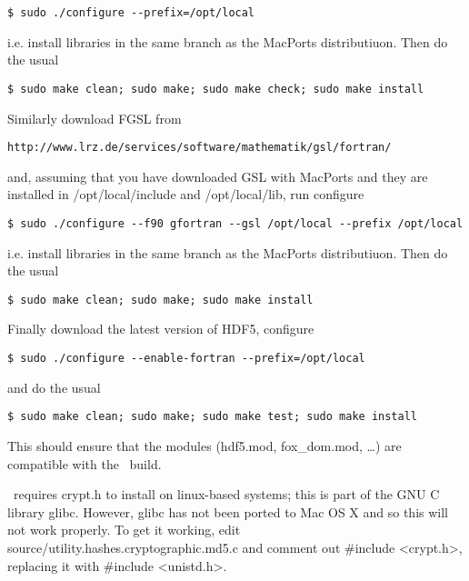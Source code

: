 \begin{verbatim}
$ sudo ./configure --prefix=/opt/local
\end{verbatim}

i.e. install libraries in the same branch as the MacPorts distributiuon. Then do the usual

\begin{verbatim}
$ sudo make clean; sudo make; sudo make check; sudo make install
\end{verbatim}

Similarly download FGSL from

\begin{verbatim}
http://www.lrz.de/services/software/mathematik/gsl/fortran/
\end{verbatim}

and, assuming that you have downloaded GSL with MacPorts and they are installed in {\normalfont \ttfamily /opt/local/include} and {\normalfont \ttfamily /opt/local/lib}, run {\normalfont \ttfamily configure}

\begin{verbatim}
$ sudo ./configure --f90 gfortran --gsl /opt/local --prefix /opt/local
\end{verbatim}

i.e. install libraries in the same branch as the MacPorts distributiuon. Then do the usual

\begin{verbatim}
$ sudo make clean; sudo make; sudo make install
\end{verbatim}

Finally download the latest version of HDF5, configure

\begin{verbatim}
$ sudo ./configure --enable-fortran --prefix=/opt/local
\end{verbatim}

and do the usual

\begin{verbatim}
$ sudo make clean; sudo make; sudo make test; sudo make install
\end{verbatim}

This should ensure that the modules ({\normalfont \ttfamily hdf5.mod}, {\normalfont \ttfamily fox\_dom.mod}, \ldots) are compatible with the \glc\ build.

\glc\ requires {\normalfont \ttfamily crypt.h} to install on linux-based systems; this is part of the GNU C library {\normalfont \ttfamily glibc}. However, {\normalfont \ttfamily glibc} has not been ported to Mac OS X and so this will not work properly. To get it working, edit {\normalfont \ttfamily source/utility.hashes.cryptographic.md5.c} and comment out {\normalfont \ttfamily \#include \textless crypt.h\textgreater}, replacing it with {\normalfont \ttfamily \#include \textless unistd.h\textgreater}.

